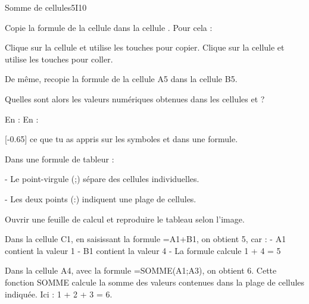 \begin{EXO}{Somme de cellules}{5I10}
\begin{tcbenumerate}[1][5]
        \tcbitem[colframe=black,boxrule=0.4pt] Copie la formule de la cellule  dans la cellule . Pour cela : 
        \begin{tcbenumerate}[2][1][alph]
            \tcbitem Clique sur la cellule  et utilise les touches  pour copier.
            \tcbitem Clique sur la cellule  et utilise les touches  pour coller. 
        \end{tcbenumerate}

        \tcbitem {}De même, recopie la formule de la cellule A5 dans la cellule B5. 
        
        \tcbitem[colframe=black,boxrule=0.4pt] Quelles sont alors les valeurs numériques obtenues dans les cellules  et  ?
        \begin{tcbenumerate}[2][1][alph]
            \tcbitem En  : 
            \tcbitem En  : 
        \end{tcbenumerate}
        
        \tcbitem {}[-0.65] ce que tu as appris sur les symboles  et  dans une formule.

        \begin{crep}[extra lines=1]
        Dans une formule de tableur :
        
        - Le point-virgule (;) sépare des cellules individuelles.

        
        - Les deux points (:) indiquent une plage de cellules.
        \end{crep}
    \end{tcbenumerate}

\exocorrection

\begin{tcbenumerate}[1]
    \tcbitem Ouvrir une feuille de calcul et reproduire le tableau selon l'image.
    
    \tcbitem Dans la cellule C1, en saisissant la formule =A1+B1, on obtient 5, car :
    - A1 contient la valeur 1
    - B1 contient la valeur 4
    - La formule calcule 1 + 4 = 5
    
    \tcbitem Dans la cellule A4, avec la formule =SOMME(A1;A3), on obtient 6.
    Cette fonction SOMME calcule la somme des valeurs contenues dans la plage de cellules indiquée.
    Ici : 1 + 2 + 3 = 6.
    

\end{tcbenumerate}
\end{EXO}
